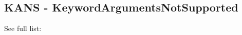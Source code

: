 \newpage
\subsection{KANS - KeywordArgumentsNotSupported}\label{sec:error_code_kans}


See full list: 








